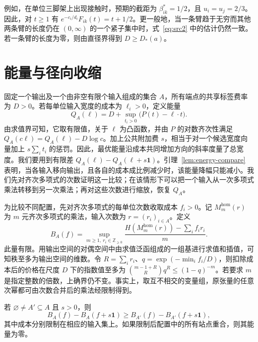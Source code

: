 例如，在单位三脚架上出现接触时，预期的截距为 $\beta^*_{ik}=1/2$，且 $u_i=u_j=2/3$。因此，对 $t\ge1$ 有 $e^{-c_i/d_i}F_{ik}(t)=t+1/2$。更一般地，当一条臂趋于无穷而其他两条臂的长度仍在 $(0,\infty)$ 的一个紧子集中时，式~\eqref{eq:src2} 中的估计仍然一致。若一条臂的长度为零，则由直径界得到 $D\ge D_*(a)$。

\section{能量与径向收缩}\label{sec:energy}

固定一个输出及一个由非空有限个输入组成的集合 $A$，所有端点的共享标签费率为 $D>0$。若每单位输入宽度的成本为 $\ell_i>0$，定义能量
\begin{equation}\label{eq:energy-widths}
 Q_A(\ell)=D+\sup_{t_i>0}\bigl(P(t)-\ell\cdot t\bigr).
\end{equation}
由求值界可知，它取有限值，关于 $\ell$ 为凸函数，并由 $P$ 的对数齐次性满足 $Q_A(c\ell)=Q_A(\ell)-D\log c$。加上公共附加费 $s$，相当于对一个候选宽度向量加上 $s\sum_i t_i$ 的惩罚。因此，最优能量沿成本共同增加方向的斜率度量了总宽度。我们要用到有限差 $Q_A(\ell)-Q_A(\ell+s\mathbf1)$。引理~\ref{lem:energy-compare} 表明，当各输入移向输出，且各自的成本成比例减少时，该能量降幅只能减小。我们先对齐次多项式的次数证明这一比较；在该情形下可以把一个输入从一次多项式乘法转移到另一次乘法；再对这些次数进行缩放，恢复 $Q_A$。

为比较不同配置，先对齐次多项式的每单位次数收取成本 $f_i>0$。记 $M_m^{\mathrm{hom}}(r)$ 为 $m$ 元齐次多项式的乘法，输入次数为 $r=(r_i)_{i\in A}$。定义
\[
 B_A(f)=\sup_{m\ge1,\ r_i\in\mathbb Z_{\ge0}}
 \frac{H(M_m^{\mathrm{hom}}(r))-\sum_i f_i r_i}{m}.
\]
此量有限。用输出空间的对偶空间中由求值泛函组成的一组基进行求值和插值，可知秩至多为输出空间的维数。令 $R=\sum_i r_i$、$q=\exp(-\min_i f_i/D)$，则扣除成本后的价格在尺度 $D$ 下的指数值至多为 $\binom{m-1+R}{R}q^R\le(1-q)^{-m}$。若要求 $m$ 是指定整数的倍数，上确界仍不变。事实上，取互不相交的变量组，原张量的任意次幂都可由次数合并后的乘法经限制得到。

\begin{lemma}[添加一个输入]\label{lem:increasing-returns}
若 $\varnothing\ne A'\subseteq A$ 且 $s>0$，则
\begin{equation}\label{eq:src5}
 B_A(f)-B_A(f+s\mathbf1)\ge
 B_{A'}(f)-B_{A'}(f+s\mathbf1),
\end{equation}
其中成本分别限制在相应的输入集上。如果限制后配置中的所有站点重合，则其能量为零。
\end{lemma}

